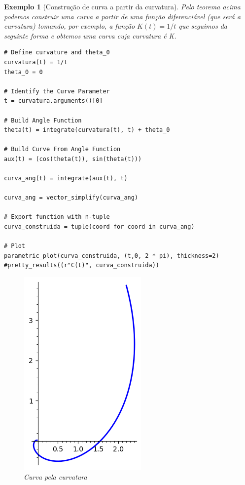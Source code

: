 \documentclass[12pt]{article}
\newtheorem{ex}{Exemplo}[section]
\begin{document}
\begin{ex}[Construção de curva a partir da curvatura]
Pelo teorema acima podemos construir uma curva a partir de uma função diferenciável (que será a curvatura) tomando, por exemplo, a função $K(t) = 1/t$ que seguimos da seguinte forma e obtemos uma curva cuja curvatura é K.

\begin{lstlisting}
# Define curvature and theta_0
curvatura(t) = 1/t
theta_0 = 0

# Identify the Curve Parameter
t = curvatura.arguments()[0]
    
# Build Angle Function
theta(t) = integrate(curvatura(t), t) + theta_0

# Build Curve From Angle Function
aux(t) = (cos(theta(t)), sin(theta(t)))

curva_ang(t) = integrate(aux(t), t)

curva_ang = vector_simplify(curva_ang)
    
# Export function with n-tuple
curva_construida = tuple(coord for coord in curva_ang)

# Plot
parametric_plot(curva_construida, (t,0, 2 * pi), thickness=2)
#pretty_results((r"C(t)", curva_construida))
\end{lstlisting}

\begin{figure}[H]
    \centering
    \includegraphics[scale=.6]{Images/ex4.2.png}
    \caption{Curva pela curvatura}
    \label{fig:ex4.2}
\end{figure}
\end{ex}
\end{document}
